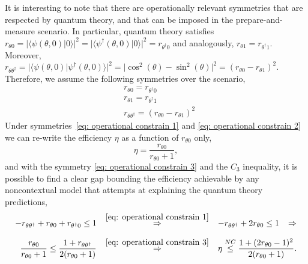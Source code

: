 \documentclass[letterpaper,onecolumn,12pt,accepted=2024-01-17]{article}
\begin{document}
It is interesting to note that there are operationally relevant symmetries that are respected by quantum theory, and that can be imposed in the prepare-and-measure scenario. In particular, quantum theory satisfies $r_{\theta 0} = \vert \langle \psi(\theta,0) \vert 0\rangle \vert^2 = \vert \langle \psi^\dagger(\theta,0) \vert 0 \rangle \vert^2 = r_{\theta^\dagger 0}$ and analogously,  $r_{\theta 1} = r_{\theta^\dagger 1}$. Moreover, $r_{\theta \theta^\dagger} = \vert \langle \psi(\theta,0)\vert \psi^\dagger(\theta,0) \rangle  \vert^2 = \vert\cos^2(\theta)-\sin^2(\theta)\vert^2= (r_{\theta 0} - r_{\theta 1})^2$. Therefore, we assume the following symmetries over the scenario, 
\begin{align}
    &r_{\theta 0} = r_{\theta^\dagger 0}\label{eq: operational constrain 1}\\
    &r_{\theta 1} = r_{\theta^\dagger 1}\label{eq: operational constrain 2}\\
    &r_{\theta \theta^\dagger} = (r_{\theta 0} - r_{\theta 1})^2\label{eq: operational constrain 3}
\end{align}
Under symmetries~\eqref{eq: operational constrain 1} and \eqref{eq: operational constrain 2} we can re-write the efficiency $\eta$ as a function of $r_{\theta 0}$ only,
\begin{equation}\label{eq: operational efficiency with constraints}
    \eta = \frac{r_{\theta 0}}{r_{\theta 0}+1},
\end{equation}
and with the symmetry \eqref{eq: operational constrain 3} and the $C_3$ inequality, it is possible to find a clear gap bounding the efficiency achievable by any noncontextual model that attempts at explaining the quantum theory predictions,
\begin{align*}
    -r_{\theta \theta^\dagger}+r_{\theta 0} + r_{\theta^\dagger 0} \leq 1 \hspace{0.8em}&\stackrel{\eqref{eq: operational constrain 1}}{\Rightarrow}\hspace{0.8em}
    -r_{\theta \theta^\dagger} + 2r_{\theta 0} \leq 1 \hspace{0.8em}\Rightarrow \\[1.5ex]
    \frac{r_{\theta 0}}{r_{\theta 0} + 1} \leq \frac{1 + r_{\theta \theta^\dagger}}{2(r_{\theta 0}+1)} \hspace{0.8em}&\stackrel{\eqref{eq: operational constrain 3}}{\Rightarrow}\hspace{0.8em} \eta \stackrel{\small{NC}}{\leq} \frac{1 + (2r_{\theta 0}-1)^2}{2(r_{\theta 0}+1)}.
\end{align*}
\end{document}
